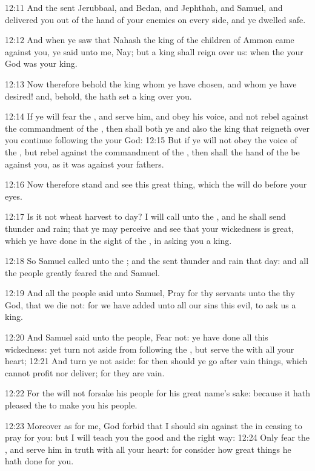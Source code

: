 12:11 And the \LORD sent Jerubbaal, and Bedan, and Jephthah, and
Samuel, and delivered you out of the hand of your enemies on every
side, and ye dwelled safe.

12:12 And when ye saw that Nahash the king of the children of Ammon
came against you, ye said unto me, Nay; but a king shall reign over
us: when the \LORD your God was your king.

12:13 Now therefore behold the king whom ye have chosen, and whom ye
have desired! and, behold, the \LORD hath set a king over you.

12:14 If ye will fear the \LORD, and serve him, and obey his voice, and
not rebel against the commandment of the \LORD, then shall both ye and
also the king that reigneth over you continue following the \LORD your
God: 12:15 But if ye will not obey the voice of the \LORD, but rebel
against the commandment of the \LORD, then shall the hand of the \LORD
be against you, as it was against your fathers.

12:16 Now therefore stand and see this great thing, which the \LORD
will do before your eyes.

12:17 Is it not wheat harvest to day? I will call unto the \LORD, and
he shall send thunder and rain; that ye may perceive and see that your
wickedness is great, which ye have done in the sight of the \LORD, in
asking you a king.

12:18 So Samuel called unto the \LORD; and the \LORD sent thunder and
rain that day: and all the people greatly feared the \LORD and Samuel.

12:19 And all the people said unto Samuel, Pray for thy servants unto
the \LORD thy God, that we die not: for we have added unto all our sins
this evil, to ask us a king.

12:20 And Samuel said unto the people, Fear not: ye have done all this
wickedness: yet turn not aside from following the \LORD, but serve the
\LORD with all your heart; 12:21 And turn ye not aside: for then should
ye go after vain things, which cannot profit nor deliver; for they are
vain.

12:22 For the \LORD will not forsake his people for his great name's
sake: because it hath pleased the \LORD to make you his people.

12:23 Moreover as for me, God forbid that I should sin against the
\LORD in ceasing to pray for you: but I will teach you the good and the
right way: 12:24 Only fear the \LORD, and serve him in truth with all
your heart: for consider how great things he hath done for you.


